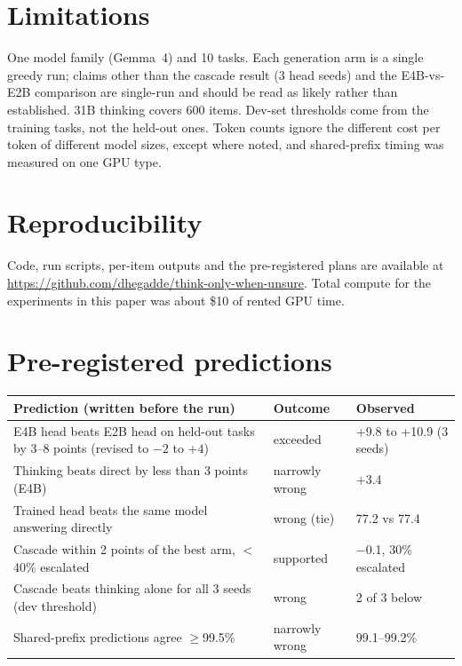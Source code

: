 \documentclass[11pt]{article}
\begin{document}
\section{Limitations}
One model family (Gemma~4) and 10 tasks. Each generation arm is a single greedy run; claims other than the
cascade result (3 head seeds) and the E4B-vs-E2B comparison are single-run and should be read as likely rather
than established. 31B thinking covers 600 items. Dev-set thresholds come from the training tasks, not the
held-out ones. Token counts ignore the different cost per token of different model sizes, except where noted,
and shared-prefix timing was measured on one GPU type.

\section*{Reproducibility}
Code, run scripts, per-item outputs and the pre-registered plans are available at \url{https://github.com/dhegadde/think-only-when-unsure}. Total compute
for the experiments in this paper was about \$10 of rented GPU time.




\appendix
\section{Pre-registered predictions}
\begin{tabular}{p{7.2cm}p{2.3cm}p{4.2cm}}
\toprule
Prediction (written before the run) & Outcome & Observed \\
\midrule
E4B head beats E2B head on held-out tasks by 3--8 points (revised to $-2$ to $+4$) & exceeded & +9.8 to +10.9 (3 seeds) \\
Thinking beats direct by less than 3 points (E4B) & narrowly wrong & +3.4 \\
Trained head beats the same model answering directly & wrong (tie) & 77.2 vs 77.4 \\
Cascade within 2 points of the best arm, $<$40\% escalated & supported & $-$0.1, 30\% escalated \\
Cascade beats thinking alone for all 3 seeds (dev threshold) & wrong & 2 of 3 below \\
Shared-prefix predictions agree $\geq$99.5\% & narrowly wrong & 99.1--99.2\% \\
\bottomrule
\end{tabular}
\end{document}
